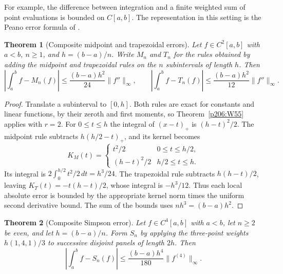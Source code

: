 \documentclass[11pt,oneside,openany]{book}
\theoremstyle{plain}
\newtheorem{theorem}{Theorem}[chapter]
\theoremstyle{definition}
\theoremstyle{remark}
\begin{document}
For example, the difference between integration and a finite
weighted sum of point evaluations is bounded on \(C[a,b]\).
The representation in this setting is the Peano error formula
of \cite[Section 3.2, Theorem 3.2.3]{stoer}.

\begin{theorem}[Composite midpoint and trapezoidal errors]\label{p206:W56}
Let \(f\in C^2[a,b]\) with \(a<b\), \(n\ge1\), and
\(h=(b-a)/n\). Write \(M_n\) and \(T_n\) for the rules obtained
by adding the midpoint and trapezoidal rules on the \(n\)
subintervals of length \(h\). Then
\[
 \left|\int_a^b f-M_n(f)\right|
     \le \frac{(b-a)h^2}{24}\lVert f''\rVert_\infty,
 \qquad
 \left|\int_a^b f-T_n(f)\right|
     \le \frac{(b-a)h^2}{12}\lVert f''\rVert_\infty .
\]
\end{theorem}

\begin{proof}
Translate a subinterval to \([0,h]\). Both rules are exact
for constants and linear functions, by their zeroth and first
moments, so Theorem~\ref{p206:W55} applies with \(r=2\).
For \(0\le t\le h\) the integral of \((x-t)_+\) is
\((h-t)^2/2\). The midpoint rule subtracts \(h(h/2-t)_+\),
and its kernel becomes
\[
 K_M(t)=
 \begin{cases}
 t^2/2 & 0\le t\le h/2,\\
 (h-t)^2/2 & h/2\le t\le h.
 \end{cases}
\]
Its integral is \(2\int_0^{h/2}t^2/2\,dt=h^3/24\).
The trapezoidal rule subtracts \(h(h-t)/2\), leaving
\(K_T(t)=-t(h-t)/2\), whose integral is \(-h^3/12\).
Thus each local absolute error is bounded by the appropriate
kernel norm times the uniform second derivative bound.
The sum of the bounds uses \(nh^3=(b-a)h^2\).
\end{proof}

\begin{theorem}[Composite Simpson error]\label{p206:W57}
Let \(f\in C^4[a,b]\) with \(a<b\), let \(n\ge2\) be even, and
let \(h=(b-a)/n\). Form \(S_n\) by applying the three-point
weights \(h(1,4,1)/3\) to successive disjoint panels of length
\(2h\). Then
\[
 \left|\int_a^b f-S_n(f)\right|
      \le \frac{(b-a)h^4}{180}\lVert f^{(4)}\rVert_\infty .
\]
\end{theorem}
\end{document}
